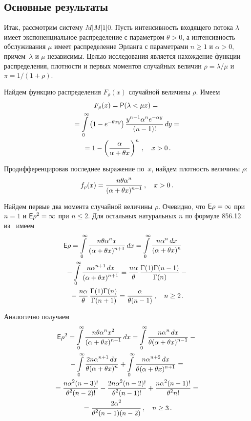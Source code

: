 \begin{multicols}{2}
\addtocounter{table}{1}  

\section{Основные результаты}


Итак, рассмотрим систему $M\vert M\vert 1\vert 0$. Пусть интенсивность входящего потока $\lambda$ имеет экспоненциальное распределение с
параметром $\theta>0$, а интенсивность обслуживания $\mu$ имеет распределение Эрланга с параметрами $n\ge 1$ и $\alpha>0$,
причем~$\lambda$ и $\mu$ независимы. Целью исследования является нахождение функции распределения, плотности и первых моментов
случайных величин $\rho=\lambda/\mu$ и $\pi=1/(1+\rho)$.

Найдем функцию распределения $F_\rho(x)$ случайной величины $\rho$. Имеем
\begin{multline*}
F_\rho(x)=\p(\lambda<\mu x)={}\\
{}=\il{0}{\infty}\left(1-e^{-\theta x y}\right)\fr{y^{n-1}\alpha^n e^{-\alpha
y}}{{{(n-1)!}}}\, dy={}\\
{}=1-\left(\fr{\alpha}{{{\alpha+\theta x}}}\right)^n\,,\quad x>0\,.
\end{multline*}

Продифференцировав последнее выражение по~$x$, найдем плотность величины $\rho$:
$$
f_\rho(x)=\fr{n\theta\alpha^n}{{(\alpha+\theta x)^{n+1}}}\,, \quad x>0\,.
$$

Найдем первые два момента случайной величины $\rho$. Очевидно, что $\e\rho=\infty$ при $n=1$ и $\e\rho^2=\infty$ при
$n\le 2$. Для остальных натуральных $n$ по формуле 856.12 из~\cite{4k} имеем
\begin{multline*}
\e\rho=\il{0}{\infty}\fr{n\theta\alpha^n x}{{(\alpha+\theta x)^{n+1}}}\,
dx=\il{0}{\infty}\fr{n\alpha^n\, dx}{{(\alpha+\theta x)^n}}-{}\\
{}- \il{0}{\infty}\fr{n\alpha^{n+1}\, dx}{{(\alpha+\theta
x)^{n+1}}}=\fr{n\alpha}{\theta}\,\fr{\Gamma(1)\Gamma(n-1)}{{\Gamma(n)}}-{}\\
{}-\fr{n\alpha}{\theta}\,\fr{\Gamma(1)\Gamma(n)
}{{\Gamma(n+1)}}=\fr{\alpha}{{\theta(n-1)}}\,,\quad n\ge 2\,.
\end{multline*}

Аналогично получаем
\begin{multline*}
\e\rho^2=\il{0}{\infty}\fr{n\theta\alpha^nx^2}{{(\alpha+\theta x)^{n+1}}}\, dx=
\il{0}{\infty}\fr{n\alpha^n\,
dx}{{\theta(\alpha+\theta x)^{n-1}}}-{}\\
{}- \il{0}{\infty}\fr{2n\alpha^{n+1}\, dx}{{\theta(\alpha+\theta
x)^n}}+\il{0}{\infty}\fr{n\alpha^{n+2}\, dx}{{\theta(\alpha+\theta x)^{n+1}}}={}\\
{}=\fr{n\alpha^2(n-3)!}{{\theta^2(n-2)!}}-\fr{2n\alpha^2(n-2)!}{{\theta^2(n-1)!}}+\fr{n\alpha^2(n-1)!}{{\theta^2n!}}={}\\
{}=\fr{2\alpha^2}{{\theta^2(n-1)(n-2)}}\,,\quad n\ge3\,.
\end{multline*}


\end{multicols}
